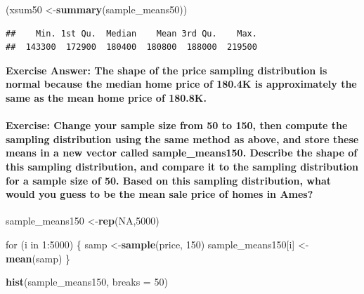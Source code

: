 \documentclass[]{article}
\newenvironment{Shaded}{\begin{snugshade}}{\end{snugshade}}
\newcommand{\KeywordTok}[1]{\textcolor[rgb]{0.13,0.29,0.53}{\textbf{{#1}}}}
\newcommand{\DataTypeTok}[1]{\textcolor[rgb]{0.13,0.29,0.53}{{#1}}}
\newcommand{\DecValTok}[1]{\textcolor[rgb]{0.00,0.00,0.81}{{#1}}}
\newcommand{\OtherTok}[1]{\textcolor[rgb]{0.56,0.35,0.01}{{#1}}}
\newcommand{\NormalTok}[1]{{#1}}
\begin{document}
\begin{Shaded}
\begin{Highlighting}[]
\NormalTok{(xsum50 <-}\KeywordTok{summary}\NormalTok{(sample_means50))}
\end{Highlighting}
\end{Shaded}

\begin{verbatim}
##    Min. 1st Qu.  Median    Mean 3rd Qu.    Max. 
##  143300  172900  180400  180800  188000  219500
\end{verbatim}

\textbf{Exercise Answer: The shape of the price sampling distribution is
normal because the median home price of 180.4K is approximately the same
as the mean home price of 180.8K.}

\paragraph{Exercise: Change your sample size from 50 to 150, then
compute the sampling distribution using the same method as above, and
store these means in a new vector called sample\_means150. Describe the
shape of this sampling distribution, and compare it to the sampling
distribution for a sample size of 50. Based on this sampling
distribution, what would you guess to be the mean sale price of homes in
Ames?}\label{exercise-change-your-sample-size-from-50-to-150-then-compute-the-sampling-distribution-using-the-same-method-as-above-and-store-these-means-in-a-new-vector-called-sampleux5fmeans150.-describe-the-shape-of-this-sampling-distribution-and-compare-it-to-the-sampling-distribution-for-a-sample-size-of-50.-based-on-this-sampling-distribution-what-would-you-guess-to-be-the-mean-sale-price-of-homes-in-ames}

\begin{Shaded}
\begin{Highlighting}[]
\NormalTok{sample_means150 <-}\KeywordTok{rep}\NormalTok{(}\OtherTok{NA}\NormalTok{,}\DecValTok{5000}\NormalTok{)}

\NormalTok{for (i in }\DecValTok{1}\NormalTok{:}\DecValTok{5000}\NormalTok{)}
\NormalTok{\{}
     \NormalTok{samp <-}\KeywordTok{sample}\NormalTok{(price, }\DecValTok{150}\NormalTok{)}
     \NormalTok{sample_means150[i] <-}\KeywordTok{mean}\NormalTok{(samp)}
\NormalTok{\}}

\KeywordTok{hist}\NormalTok{(sample_means150, }\DataTypeTok{breaks =} \DecValTok{50}\NormalTok{)}
\end{Highlighting}
\end{Shaded}
\end{document}
